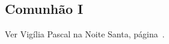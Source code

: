 
\subsection{Comunhão I}\label{subsection:tempus-paschale/dominica-resurrectionis/communio-1}

\begin{rubrica}
  Ver Vigília Pascal na Noite Santa, página~\pageref{subsection:hebdomada-sancta/ad-vigiliam-paschalem-in-nocte-sancta/communio}.
\end{rubrica}